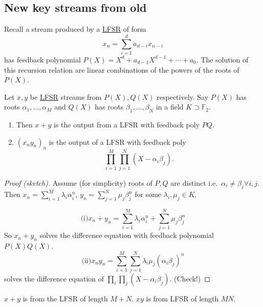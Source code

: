 \documentclass{article}
\newcommand{\F}{\mathbb{F}}
\newcommand{\1}[1]{\mathbbm{1}_{#1}}
\begin{document}
\subsection{New key streams from old}
Recall a stream produced by a \hyperlink{def:lfsr}{LFSR} of form
\begin{equation*}
    x_n = \sum_{i=1}^d a_{d-i} x_{n-i}
\end{equation*}
has feedback polynomial $P(X) = X^d + a_{d-1} X^{d-1} + \dotsb + a_0$.
The solution of this recursion relation are linear combinations of the powers of the roots of $P(X)$.
\begin{nlemma}\label{lem:3.3}
    Let $x,y$ be \hyperlink{def:lfsr}{LFSR} streams from $P(X),Q(X)$ respectively.
    Say $P(X)$ has roots $\alpha_1, \dotsc, \alpha_M$ and $Q(X)$ has roots $\beta_1, \dotsc, \beta_N$ in a field $K \supset \F_2$.
    \begin{enumerate} [label=(\roman*)]
        \item Then $x+y$ is the output from a LFSR with feedback poly $PQ$.
        \item $(x_n y_n)_n$ is the output of a LFSR with feedback poly
            \begin{equation*}
                \prod_{i=1}^M \prod_{j=1}^N (X - \alpha_i \beta_j).
            \end{equation*}
    \end{enumerate}
\end{nlemma}
\begin{proof}[Proof (sketch)]
    Assume (for simplicity) roots of $P,Q$ are distinct i.e.\ $\alpha_i \neq \beta_j \forall i,j$.
    Then $x_n = \sum_{i=1}^M \lambda_i \alpha_i^n$, $y_n = \sum_{j=1}^N \mu_j \beta_j^n$ for some $\lambda_i, \mu_j \in K$.

    \begin{equation*}
        \text{(i)} x_n + y_n = \sum_{i=1}^M \lambda_i \alpha_i^n + \sum_{j=1}^N \mu_j \beta_j^n
    \end{equation*}
    So $x_n + y_n$ solves the difference equation with feedback polynomial $P(X) Q(X)$.
    \begin{equation*}
        \text{(ii)} x_n y_n = \sum_{i=1}^M \sum_{j=1}^N \lambda_i \mu_j (\alpha_i \beta_j)^n
    \end{equation*}
    solves the difference equation of $\prod_i \prod_j (X - \alpha_i \beta_j)$. (Check!)
\end{proof}
\begin{remark}
    $x+y$ is from the LFSR of length $M+N$.
    $xy$ is from LFSR of length $MN$.
\end{remark}
\end{document}
